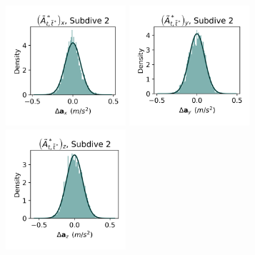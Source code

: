 \documentclass{article}
\begin{document}
\begin{center}
        \includegraphics[width=1.75in]{../Plots/2019/20190902-182840-CATs_OB_1_0_267_CarHHMM1_empirical_hist_Ax_1.png}
        \includegraphics[width=1.75in]{../Plots/2019/20190902-182840-CATs_OB_1_0_267_CarHHMM1_empirical_hist_Ay_1.png}
        \includegraphics[width=1.75in]{../Plots/2019/20190902-182840-CATs_OB_1_0_267_CarHHMM1_empirical_hist_Az_1.png}
        

\end{center}
\end{document}
